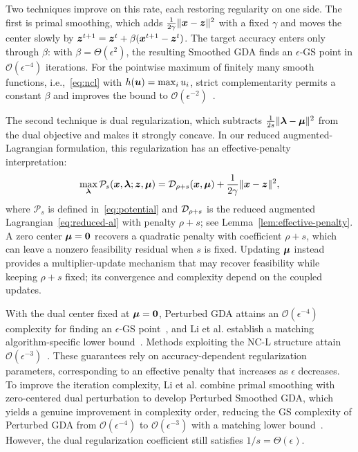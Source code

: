 Two techniques improve on this rate, each restoring regularity on one side.
The first is primal smoothing, which adds $\frac{1}{2\gamma}\|\bm{x}-\bm{z}\|^2$ with
a fixed $\gamma$ and moves the center slowly by
$\bm{z}^{t+1}=\bm{z}^t+\beta(\bm{x}^{t+1}-\bm{z}^t)$. The target accuracy enters only
through $\beta$: with $\beta=\Theta(\epsilon^2)$, the resulting Smoothed GDA
finds an $\epsilon$-GS point in $\mathcal O(\epsilon^{-4})$ iterations. For the
pointwise maximum of finitely many smooth functions, i.e.,~\eqref{eq:ncl} with
$h(\bm{u})=\max_i u_i$, strict complementarity permits a constant $\beta$ and
improves the bound to $\mathcal O(\epsilon^{-2})$~\cite{zhang2020single}.

The second technique is dual regularization, which subtracts
$\frac{1}{2s}\|\bm{\lambda}-\bm{\mu}\|^2$ from the dual objective and makes it strongly
concave. In our reduced augmented-Lagrangian formulation, this regularization
has an effective-penalty interpretation:
\begin{equation}\label{eq:intro-effective-penalty}
  \max_{\bm{\lambda}}\mathcal P_s(\bm{x},\bm{\lambda};\bm{z},\bm{\mu})
  =\mathcal{D}_{\rho+s}(\bm{x},\bm{\mu})
    +\frac{1}{2\gamma}\|\bm{x}-\bm{z}\|^2,
\end{equation}
where $\mathcal P_s$ is defined in~\eqref{eq:potential} and
$\mathcal{D}_{\rho+s}$ is the reduced augmented Lagrangian~\eqref{eq:reduced-al}
with penalty $\rho+s$; see Lemma~\ref{lem:effective-penalty}.
A zero center $\bm{\mu}=\mathbf 0$ recovers a quadratic penalty with
coefficient $\rho+s$, which can leave a nonzero feasibility residual
when $s$ is fixed. Updating $\bm{\mu}$ instead provides a multiplier-update
mechanism that may recover feasibility while keeping $\rho+s$ fixed;
its convergence and complexity depend on the coupled updates.

With the dual center fixed at $\bm{\mu}=\mathbf 0$, Perturbed GDA
attains an $\mathcal O(\epsilon^{-4})$ complexity for finding an
$\epsilon$-GS point~\cite{lu2020hybrid,xu2023unified}, and Li et al. establish
a matching algorithm-specific lower bound~\cite{li2026smoothing}.
Methods exploiting the NC-L structure attain
$\mathcal O(\epsilon^{-3})$~\cite{pan2021efficient,he2024approximation,xu2026rada}.
These guarantees rely on accuracy-dependent regularization parameters,
corresponding to an effective penalty that increases as $\epsilon$ decreases. To improve the iteration complexity, Li et al. combine primal smoothing
with zero-centered dual perturbation to develop Perturbed Smoothed GDA,
which yields a genuine improvement in complexity order, reducing
the GS complexity of Perturbed GDA from $\mathcal O(\epsilon^{-4})$
to $\mathcal O(\epsilon^{-3})$ with a matching lower
bound~\cite{li2026smoothing}. However, the dual regularization coefficient still satisfies
$1/s=\Theta(\epsilon)$.

